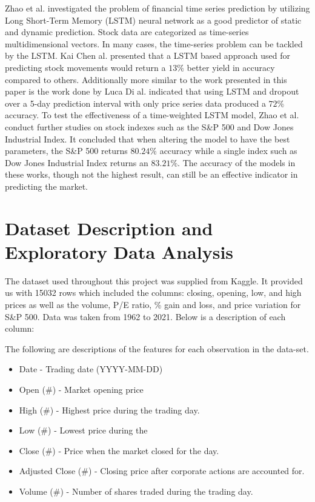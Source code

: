 \documentclass{article}
\begin{document}
Zhao et al. investigated the problem of financial time series prediction by utilizing Long Short-Term Memory (LSTM) neural network as a good predictor of static and dynamic prediction. Stock data are categorized as time-series multidimensional vectors. In many cases, the time-series problem can be tackled by the LSTM. Kai Chen al. presented that a LSTM based approach used for predicting stock movements would return a $13\%$ better yield in accuracy compared to others.\cite{LSTM} Additionally more similar to the work presented in this paper is the work done by Luca Di al. indicated that using LSTM and dropout over a 5-day prediction interval with only price series data produced a $72\%$ accuracy.\cite{Time-Weighted LSTM} To test the effectiveness of a time-weighted LSTM model, Zhao et al. conduct further studies on stock indexes such as the S\&P 500 and Dow Jones Industrial Index. It concluded that when altering the model to have the best parameters, the S\&P 500 returns $80.24\%$ accuracy while a single index such as Dow Jones Industrial Index returns an $83.21\%$.\cite{RNN} The accuracy of the models in these works, though not the highest result, can still be an effective indicator in predicting the market.

\section{Dataset Description and Exploratory Data Analysis} 
The dataset used throughout this project was supplied from Kaggle. It provided us with 15032 rows which included the columns: closing, opening, low, and high prices as well as the volume, P/E ratio, \% gain and loss, and price variation for S\&P 500. Data was taken from 1962 to 2021. 
Below is a description of each column:

The following are descriptions of the features for each observation in the data-set.

	\begin{itemize}
		\item Date - Trading date (YYYY-MM-DD)
		\item Open (\#) - Market opening price
		\item High (\#) - Highest price during the trading day.
		\item Low (\#) - Lowest price during the
		\item Close (\#) - Price when the market closed for the day.
		\item Adjusted Close (\#) - Closing price after corporate actions are accounted for.
		\item Volume (\#) - Number of shares traded during the trading day.
	\end{itemize}
	
\end{document}
